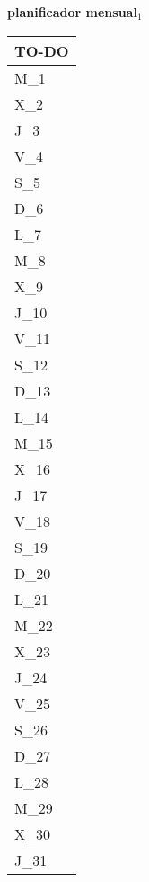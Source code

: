 \clearpage
{\raggedright
	\fontsize{25}{50}\selectfont
	\textbf{\NextYear}
}\scriptsize{\textbf{planificador mensual$_1$}}\\[11.3pt]



	\noindent\dotfill
	\renewcommand{\arraystretch}{1.5}\scriptsize
		\begin{longtabu} to \textwidth { X[l]}
		\centering \small{\textbf{TO-DO}} \\
		\toprule
		M_{1} \dotfill\\
		X_{2} \dotfill\\
		J_{3} \dotfill\\
		V_{4} \dotfill\\
		S_{5} \dotfill\\
		D_{6} \dotfill\\
		\hline
		L_{7} \dotfill\\
		M_{8} \dotfill\\
		X_{9} \dotfill\\
		J_{10} \dotfill\\
		V_{11} \dotfill\\
		S_{12} \dotfill\\
		D_{13} \dotfill\\
		\hline
		L_{14} \dotfill\\
		M_{15} \dotfill\\
		X_{16} \dotfill\\
		J_{17} \dotfill\\
		V_{18} \dotfill\\
		S_{19} \dotfill\\
		D_{20} \dotfill\\
		\hline
		L_{21} \dotfill\\
		M_{22} \dotfill\\
		X_{23} \dotfill\\
		J_{24} \dotfill\\
		V_{25} \dotfill\\
		S_{26} \dotfill\\
		D_{27} \dotfill\\
		\hline
		L_{28} \dotfill\\
		M_{29} \dotfill\\
		X_{30} \dotfill\\
		J_{31} \dotfill\\

		\bottomrule

	\end{longtabu}


\clearpage
